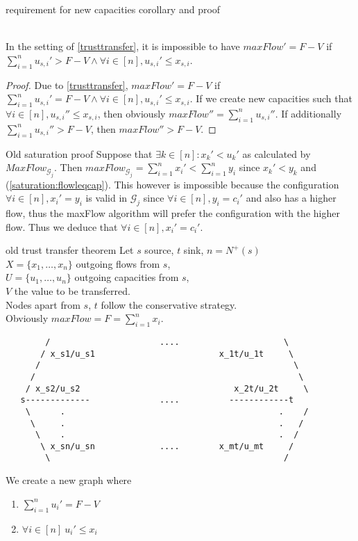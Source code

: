 requirement for new capacities corollary and proof
   \begin{corollary}[Requirement for $\sum\limits_{i=1}^{n}{u_{s, i}'} = F - V$, $u_{s, i}' \leq x_{s, i}$] \ \\
      In the setting of \ref{trusttransfer}, it is impossible to have $maxFlow' = F - V$ if
      $\sum\limits_{i=1}^{n}{u_{s, i}'} > F - V \wedge \forall i \in [n],u_{s, i}' \leq x_{s, i}$.
   \end{corollary}
   \begin{proof}
      Due to \ref{trusttransfer}, $maxFlow' = F - V$ if $\sum\limits_{i=1}^{n}{u_{s, i}'} = F - V
      \wedge \forall i \in [n], u_{s, i}' \leq x_{s, i}$. If we create new capacities such that
      $\forall i \in [n], u_{s,i}'' \leq x_{s,i}$, then obviously $maxFlow'' = \sum\limits_{i=1}^{n}{u_{s,i}''}$. If
      additionally $\sum\limits_{i=1}^{n}{u_{s,i}''} > F - V$, then $maxFlow'' > F - V$.
   \end{proof}

Old saturation proof
   Suppose that $\exists k \in [n] : x_k' 
   < u_k'$ as calculated by $MaxFlow_{\mathcal{G}_j}$. Then $maxFlow_{\mathcal{G}_j} =
   \sum\limits_{i=1}^{n}x_i' < \sum\limits_{i=1}^{n}y_i$ since $x_k' < y_k$ and (\ref{saturation:flowleqcap}).
   This however is impossible because the configuration $\forall i \in [n], x_i' = y_i$ is valid in $\mathcal{G}_j$ since
   $\forall i \in [n], y_i = c_i'$ and also has a higher flow, thus the maxFlow algorithm will 
   prefer the configuration with the higher flow. Thus we deduce that $\forall i \in [n], x_i' = c_i'$.

old trust transfer theorem
   Let $s$ source, $t$ sink, $n = N^{+}(s)$ \\
   $X = \{x_1, \dots, x_n\}$ outgoing flows from $s$, \\
   $U = \{u_1, \dots, u_n\}$ outgoing capacities from $s$, \\
   $V$ the value to be transferred. \\
   Nodes apart from $s$, $t$ follow the conservative strategy. \\
   Obviously $maxFlow = F = \sum\limits_{i=1}^{n}{x_i}$.
   {\em \begin{lstlisting}
        /                      ....                     \
       / x_s1/u_s1                         x_1t/u_1t     \
      /                                                   \
     /                                                     \
    / x_s2/u_s2                               x_2t/u_2t     \
   s-------------              ....          ------------t
    \      .                                           .    /
     \     .                                           .   /
      \    .                                           .  /
       \ x_sn/u_sn             ....        x_mt/u_mt     /
        \                                               /
   \end{lstlisting}}
   We create a new graph where
   \begin{enumerate}
     \item  $\sum\limits_{i=1}^{n}{u_i'} = F - V$
     \item $\forall i \in [n] \: u_i' \leq x_i$
   \end{enumerate}

